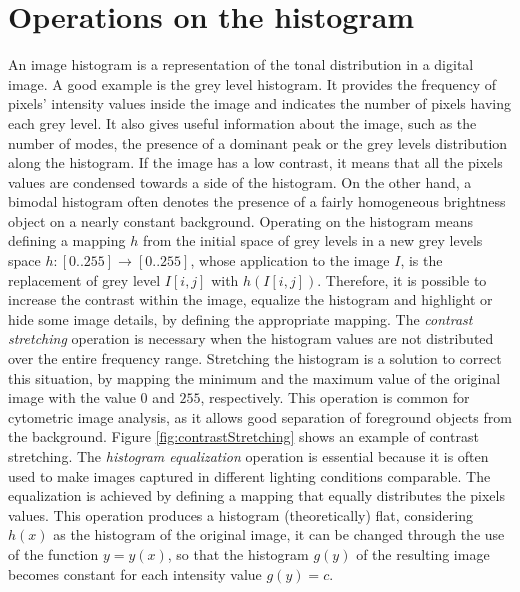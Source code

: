 \documentclass[final,a4paper,12pt,english]{UnicaPhdThesis3}
\begin{document}
\section{Operations on the histogram}\label{histop} %
An image histogram is a representation of the tonal distribution in a digital image. A good example is the grey level histogram. It provides the frequency of pixels' intensity values inside the image and indicates the number of pixels having each grey level. 
It also gives useful information about the image, such as the number of modes, the presence of a dominant peak or the grey levels distribution along the histogram. If the image has a low contrast, it means that all the pixels values ​are condensed towards a side of the histogram. On the other hand, a bimodal histogram often denotes the presence of a fairly homogeneous brightness object on a nearly constant background. Operating on the histogram means defining a mapping $h$ from the initial space of grey levels in a new grey levels space $h: [0..255] \rightarrow [0..255]$, whose application to the image $I$, is the replacement of grey level $I[i, j]$ with $h(I[i, j])$. Therefore, it is possible to increase the contrast within the image, equalize the histogram and highlight or hide some image details, by defining the appropriate mapping.
The \textit{contrast stretching} operation is necessary when the histogram values are not distributed over the entire frequency range. Stretching the histogram is a solution to correct this situation, by mapping the minimum and the maximum value of the original image with the value $0$ and $255$, respectively. This operation is common for cytometric image analysis, as it allows good separation of foreground objects from the background. Figure \ref{fig:contrastStretching} shows an example of contrast stretching.
The \textit{histogram equalization} operation is essential because it is often used to make images captured in different lighting conditions comparable. The equalization is achieved by defining a mapping that equally distributes the pixels values. This operation produces a histogram (theoretically) flat, considering $h(x)$ as the histogram of the original image, it can be changed through the use of the function $y = y(x)$, so that the histogram $g(y)$ of the resulting image becomes constant for each intensity value $g(y) = c$.
\end{document}
